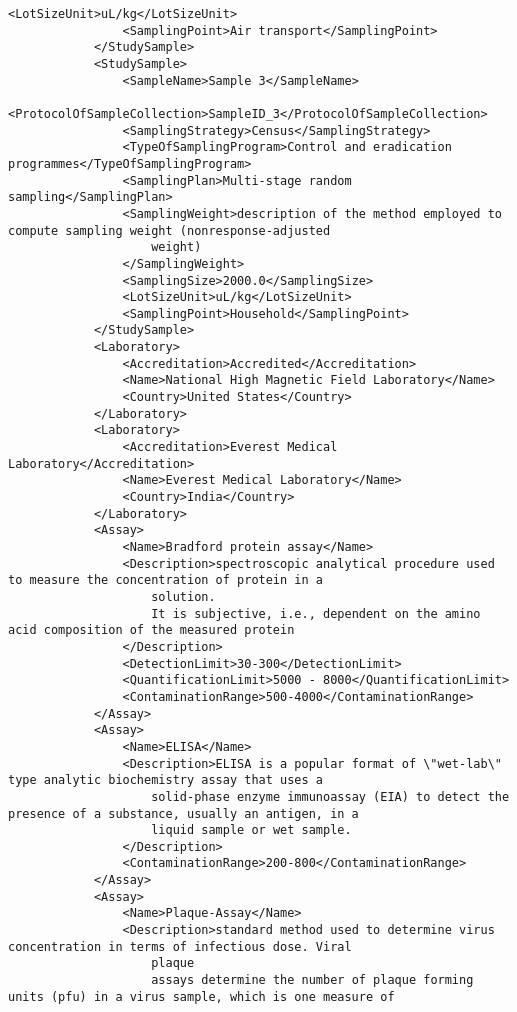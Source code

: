 \begin{lstlisting}[language=RAKIP, caption={Example of DoseResponseModel}]
                <LotSizeUnit>uL/kg</LotSizeUnit>
                <SamplingPoint>Air transport</SamplingPoint>
            </StudySample>
            <StudySample>
                <SampleName>Sample 3</SampleName>
                <ProtocolOfSampleCollection>SampleID_3</ProtocolOfSampleCollection>
                <SamplingStrategy>Census</SamplingStrategy>
                <TypeOfSamplingProgram>Control and eradication programmes</TypeOfSamplingProgram>
                <SamplingPlan>Multi-stage random sampling</SamplingPlan>
                <SamplingWeight>description of the method employed to compute sampling weight (nonresponse-adjusted
                    weight)
                </SamplingWeight>
                <SamplingSize>2000.0</SamplingSize>
                <LotSizeUnit>uL/kg</LotSizeUnit>
                <SamplingPoint>Household</SamplingPoint>
            </StudySample>
            <Laboratory>
                <Accreditation>Accredited</Accreditation>
                <Name>National High Magnetic Field Laboratory</Name>
                <Country>United States</Country>
            </Laboratory>
            <Laboratory>
                <Accreditation>Everest Medical Laboratory</Accreditation>
                <Name>Everest Medical Laboratory</Name>
                <Country>India</Country>
            </Laboratory>
            <Assay>
                <Name>Bradford protein assay</Name>
                <Description>spectroscopic analytical procedure used to measure the concentration of protein in a
                    solution.
                    It is subjective, i.e., dependent on the amino acid composition of the measured protein
                </Description>
                <DetectionLimit>30-300</DetectionLimit>
                <QuantificationLimit>5000 - 8000</QuantificationLimit>
                <ContaminationRange>500-4000</ContaminationRange>
            </Assay>
            <Assay>
                <Name>ELISA</Name>
                <Description>ELISA is a popular format of \"wet-lab\" type analytic biochemistry assay that uses a
                    solid-phase enzyme immunoassay (EIA) to detect the presence of a substance, usually an antigen, in a
                    liquid sample or wet sample.
                </Description>
                <ContaminationRange>200-800</ContaminationRange>
            </Assay>
            <Assay>
                <Name>Plaque-Assay</Name>
                <Description>standard method used to determine virus concentration in terms of infectious dose. Viral
                    plaque
                    assays determine the number of plaque forming units (pfu) in a virus sample, which is one measure of

\end{lstlisting}

